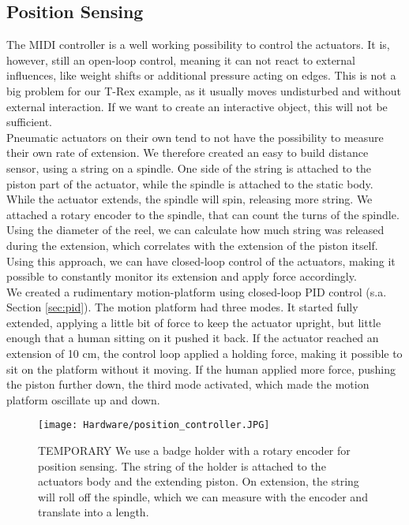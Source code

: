 \subsection{Position Sensing}
The MIDI controller is a well working possibility to control the actuators. It is, however, still an open-loop control, meaning it can not react to external influences, like weight shifts or additional pressure acting on edges. This is not a big problem for our T-Rex example, as it usually moves undisturbed and without external interaction. If we want to create an interactive object, this will not be sufficient.\\
Pneumatic actuators on their own tend to not have the possibility to measure their own rate of extension. We therefore created an easy to build distance sensor, using a string on a spindle. One side of the string is attached to the piston part of the actuator, while the spindle is attached to the static body. While the actuator extends, the spindle will spin, releasing more string. We attached a rotary encoder to the spindle, that can count the turns of the spindle. Using the diameter of the reel, we can calculate how much string was released during the extension, which correlates with the extension of the piston itself.\\
Using this approach, we can have closed-loop control of the actuators, making it possible to constantly monitor its extension and apply force accordingly.\\
We created a rudimentary motion-platform using closed-loop PID control (s.a. Section \ref{sec:pid}). The motion platform had three modes. It started fully extended, applying a little bit of force to keep the actuator upright, but little enough that a human sitting on it pushed it back. If the actuator reached an extension of 10 cm, the control loop applied a holding force, making it possible to sit on the platform without it moving. If the human applied more force, pushing the piston further down, the third mode activated, which made the motion platform oscillate up and down.

\begin{figure}[h!]
    \texttt{[image: Hardware/position\_controller.JPG]}
    \centering
    \caption{TEMPORARY We use a badge holder with a rotary encoder for position sensing. The string of the holder is attached to the actuators body and the extending piston. On extension, the string will roll off the spindle, which we can measure with the encoder and translate into a length.}
    \label{fig:position_control}
\end{figure}

